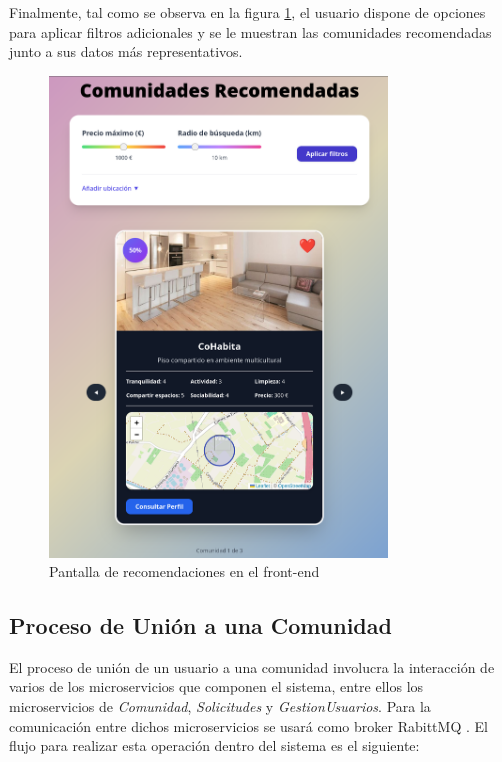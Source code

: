 Finalmente, tal como se observa en la figura \ref{fig:frontend-recomendador}, el usuario dispone de opciones para aplicar filtros adicionales y se le muestran las comunidades recomendadas junto a sus datos más representativos.
\vspace{0.5em}
\begin{figure}[H]
  \centering
  \includegraphics[width=0.8\textwidth]{fotos/frontend-recomendador.png}
  \caption{Pantalla de recomendaciones en el front-end}
  \label{fig:frontend-recomendador}
\end{figure}

\subsection{Proceso de Unión a una Comunidad}

El proceso de unión de un usuario a una comunidad involucra la interacción de varios de los microservicios que componen el sistema, entre ellos los microservicios de \textit{Comunidad}, \textit{Solicitudes} y \textit{GestionUsuarios}.
Para la comunicación entre dichos microservicios se usará como broker RabittMQ \cite{RabbitMQ}. El flujo para realizar esta operación dentro del sistema es el siguiente:

